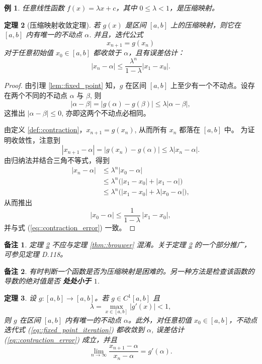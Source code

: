 \documentclass[a4paper]{ctexart}
\newtheorem{theorem}{定理}
\newtheorem{remark}{备注}
\newtheorem{example}[theorem]{例}
\numberwithin{theorem}{section}
\numberwithin{equation}{section}
\numberwithin{figure}{section}
\numberwithin{remark}{section}
\begin{document}
\begin{example}
任意线性函数 \( f(x) = \lambda x + c \)，其中 \( 0 \leq \lambda < 1 \)，是压缩映射。
\end{example}

\begin{theorem}[压缩映射收敛定理]
    \label{thm::contraction}
若 \( g(x) \) 是区间 \([a, b]\) 上的压缩映射，则它在 \([a, b]\) 内有唯一的不动点 \( \alpha \). 并且，迭代公式
\[
x_{n+1} = g(x_n)
\]
对于任意初始值 \( x_0 \in [a, b] \) 都收敛于 \( \alpha \)，且有误差估计：
\begin{equation}
    \label{eq::contraction_error}
|x_n - \alpha| \leq \frac{\lambda^n}{1 - \lambda} |x_1 - x_0|.
\end{equation}
\end{theorem}

\begin{proof}
由引理 \ref{lem::fixed_point} 知，$g$ 在区间 $[a,b]$ 上至少有一个不动点。设存在两个不同的不动点 $\alpha$ 与 $\beta$, 则
\[
|\alpha-\beta|=|g(\alpha)-g(\beta)|\le \lambda |\alpha-\beta|,
\]
这推出 $|\alpha-\beta|\le 0$, 亦即这两个不动点必相同。

由定义 \ref{def::contraction}，$x_{n+1}=g(x_n)$, 从而所有 $x_n$ 都落在 $[a,b]$ 中。
为证明收敛性，注意到
\[
|x_{n+1}-\alpha| = |g(x_n)-g(\alpha)| \le \lambda |x_n-\alpha|.
\]
由归纳法并结合三角不等式，得到
\[
\begin{aligned}
|x_n-\alpha|
&\le \lambda^n |x_0-\alpha| \\
&\le \lambda^n\bigl(|x_1-x_0|+|x_1-\alpha|\bigr) \\
&\le \lambda^n\bigl(|x_1-x_0|+\lambda |x_0-\alpha|\bigr),
\end{aligned}
\]
从而推出
\[
|x_0-\alpha| \le \frac{1}{1-\lambda}\,|x_1-x_0|,
\]
并与式 (\ref{eq::contraction_error}) 一致。
\end{proof}

\begin{remark}
定理 \ref{thm::contraction} 不应与定理 \ref{thm::brouwer} 混淆。关于定理 \ref{thm::contraction} 的一个部分推广，可参见定理 D.118。
\end{remark}

\begin{remark}
有时判断一个函数是否为压缩映射是困难的。另一种方法是检查该函数的导数的绝对值是否 \textbf{处处小于 $1$}.
\end{remark}


\begin{theorem}
    \label{thm::fixed_point_convergence}
设 $g:[a,b]\to [a,b]$。若 $g\in C^{1}[a,b]$ 且
\[
\lambda=\max_{x\in [a,b]}|g'(x)|<1,
\]
则 $g$ 在区间 $[a,b]$ 内有唯一的不动点 $\alpha$。此外，对任意初值 $x_0\in [a,b]$，不动点迭代式 (\ref{eq::fixed_point_iteration}) 都收敛到 $\alpha$, 
误差估计 (\ref{eq::contraction_error}) 成立，并且
\begin{equation}
    \label{eq::fixed_point_derivative}
\lim_{n\to\infty}\frac{x_{n+1}-\alpha}{x_n-\alpha}=g'(\alpha).
\end{equation}
\end{theorem}
\end{document}
